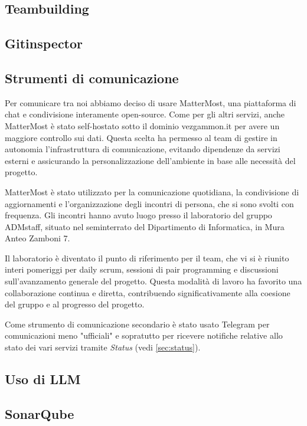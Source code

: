 \documentclass{article}
\begin{document}
\subsection{Teambuilding} \label{sec:teambuilding}

\subsection{Gitinspector}

\subsection{Strumenti di comunicazione} \label{sec:mm}
Per comunicare tra noi abbiamo deciso di usare MatterMost, una piattaforma di chat e condivisione interamente open-source. Come per gli altri servizi, anche MatterMost 
è stato self-hostato sotto il dominio vezgammon.it per avere un maggiore controllo sui dati. Questa scelta ha permesso al team di gestire in autonomia 
l'infrastruttura di comunicazione, evitando dipendenze da servizi esterni e assicurando la personalizzazione dell'ambiente in base alle necessità del progetto. \par
MatterMost è stato utilizzato per la comunicazione quotidiana, la condivisione di aggiornamenti e l'organizzazione degli incontri di persona, che si sono svolti con frequenza. 
Gli incontri hanno avuto luogo presso il laboratorio del gruppo ADMstaff, situato nel seminterrato del Dipartimento di Informatica, in Mura Anteo Zamboni 7. \par
Il laboratorio è diventato il punto di riferimento per il team, che vi si è riunito interi pomeriggi per daily scrum, sessioni di pair programming e discussioni sull'avanzamento 
generale del progetto. Questa modalità di lavoro ha favorito una collaborazione continua e diretta, contribuendo significativamente alla coesione del gruppo e al progresso del progetto. \par
Come strumento di comunicazione secondario è stato usato Telegram per comunicazioni meno "ufficiali" e sopratutto per ricevere notifiche relative allo stato dei vari servizi tramite 
\textit{Status} (vedi \ref{sec:status}).

\subsection{Uso di LLM}

\subsection{SonarQube} \label{sec:sq}
\end{document}
